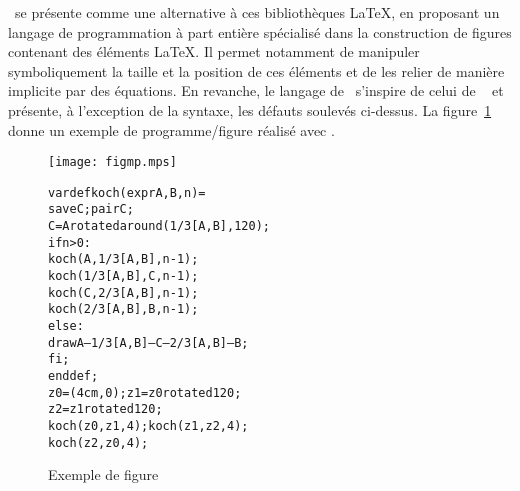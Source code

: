 \documentclass[twoside]{studia-Hermann}
\newcommand{\asymptote}{\textsf{Asymptote}}
\newcommand{\metapost}{\MP}
\newcommand{\metafont}{\MF}
\begin{document}
\metapost\ se présente comme une alternative à ces bibliothèques
\LaTeX, en proposant un langage de programmation à part entière
spécialisé dans la construction de figures contenant des éléments
\LaTeX. Il permet notamment de manipuler symboliquement la taille et
la position de ces éléments et de les relier de manière implicite par
des équations. En revanche, le langage de \metapost\ s'inspire de
celui de \metafont~\cite{metafont} et présente, à l'exception de la
syntaxe, les défauts soulevés ci-dessus. La figure~\ref{fig:metapost}
donne un exemple de programme/figure réalisé avec \metapost.
\begin{figure}[t]
\vspace*{1em}
\begin{minipage}{.3\linewidth}
  \texttt{[image: figmp.mps]}
\end{minipage}
\begin{minipage}{.7\linewidth}
\small
\begin{alltt}
  vardef koch(expr A,B,n) =
    save C; pair C; 
    C = A rotatedaround(1/3[A,B], 120);
    if n>0:
      koch( A,        1/3[A,B], n-1);
      koch( 1/3[A,B], C,        n-1);
      koch( C,        2/3[A,B], n-1);
      koch( 2/3[A,B], B,        n-1);
    else:
      draw A--1/3[A,B]--C--2/3[A,B]--B;
    fi;
  enddef;
  z0=(4cm,0); z1=z0 rotated 120; 
  z2=z1 rotated 120;
  koch( z0, z1, 4 ); koch( z1, z2, 4 ); 
  koch( z2, z0, 4 );
\end{alltt}
\end{minipage}
\caption{Exemple de figure \metapost}\label{fig:metapost}
\end{figure}
\end{document}
